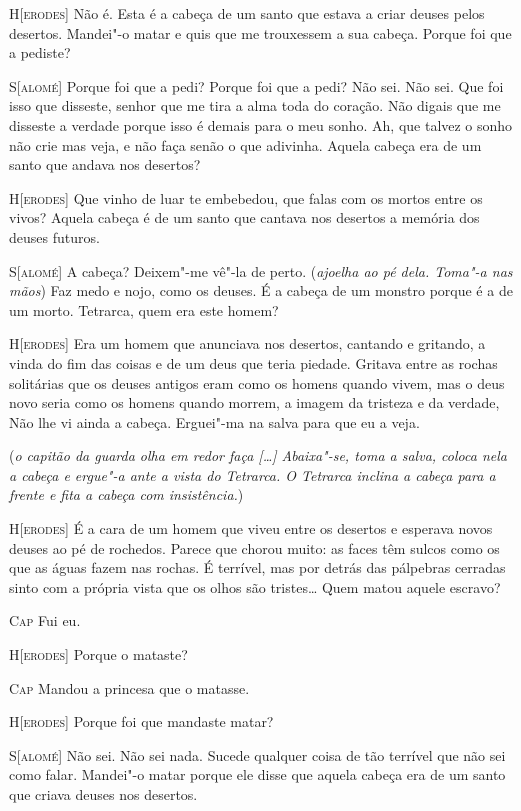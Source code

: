 \textsc{H[erodes]} Não é. Esta é a cabeça de um santo que estava a criar
deuses pelos desertos. Mandei"-o matar e quis que me trouxessem a sua
cabeça. Porque foi que a pediste?

\textsc{S[alomé]} Porque foi que a pedi? Porque foi que a pedi? Não sei. Não
sei. Que foi isso que disseste, senhor que me tira a alma toda do
coração. Não digais que me disseste a verdade porque isso é demais
para o meu sonho. Ah, que talvez o sonho não crie mas veja, e não
faça senão o que adivinha. Aquela cabeça era de um santo que andava
nos desertos?

\textsc{H[erodes]} Que vinho de luar te embebedou, que falas com os mortos
entre os vivos? Aquela cabeça é de um santo que cantava nos desertos
a memória dos deuses futuros.

\textsc{S[alomé]} A cabeça? Deixem"-me vê"-la de perto. (\textit{ajoelha ao pé
dela. Toma"-a nas mãos}) Faz medo e nojo, como os deuses. É a cabeça
de um monstro porque é a de um morto. Tetrarca, quem era este homem? 

\textsc{H[erodes]} Era um homem que anunciava nos desertos, cantando e
gritando, a vinda do fim das coisas e de um deus que teria piedade.
Gritava entre as rochas solitárias que os deuses antigos eram como os
homens quando vivem, mas o deus novo seria como os homens quando
morrem, a imagem da tristeza e da verdade, Não lhe vi ainda a cabeça.
Erguei"-ma na salva para que eu a veja.

(\textit{o capitão da guarda olha em redor faça
 \emph{[\ldots{}]} Abaixa"-se, toma a salva, coloca nela a cabeça e
 ergue"-a ante a vista do Tetrarca. O Tetrarca inclina a cabeça para a
 frente e fita a cabeça com insistência.}) 

\textsc{H[erodes]} É a cara de um homem que viveu entre os desertos e
esperava novos deuses ao pé de rochedos. Parece que chorou muito: as
faces têm sulcos como os que as águas fazem nas rochas. É terrível,
mas por detrás das pálpebras cerradas sinto com a própria vista que
os olhos são tristes\ldots{} Quem matou aquele escravo?

\textsc{Cap} Fui eu.

\textsc{H[erodes]} Porque o mataste?

\textsc{Cap} Mandou a princesa que o matasse.

\textsc{H[erodes]} Porque foi que mandaste matar?

\textsc{S[alomé]} Não sei. Não sei nada. Sucede qualquer coisa de tão
terrível que não sei como falar. Mandei"-o matar porque ele disse que
aquela cabeça era de um santo que criava deuses nos desertos.

